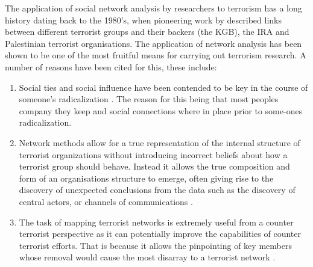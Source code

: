 The application of social network analysis by researchers to terrorism has a long history dating back to the 1980's, when pioneering work by \citep{sterling1981terror} described links between different terrorist groups and their backers (the KGB), the IRA and Palestinian terrorist organisations. The application of network analysis has been shown to be one of the most fruitful means for carrying out terrorism research. A number of reasons have been cited for this, these include:
\begin{enumerate}
\item Social ties and social influence have been contended to be key in the course of someone's radicalization \citep{hegghammer2006terrorist}. The reason for this being that most peoples company they keep and social connections where in place prior to some-ones radicalization.
\item Network methods allow for a true representation of the internal structure of terrorist organizations without introducing incorrect beliefs about how a terrorist group should behave. Instead it allows the true composition and form of an organisations structure to emerge, often giving rise to the discovery of unexpected conclusions from the data such as the discovery of central actors, or channels of communications \citep{morselli2009inside}.
\item  The task of mapping terrorist networks is extremely useful from a counter terrorist perspective as it can potentially improve the capabilities of counter terrorist efforts. That is because it allows the pinpointing of key members whose removal would cause the most disarray to a terrorist network \citep{joffres2011strategies}. 
\end{enumerate}
